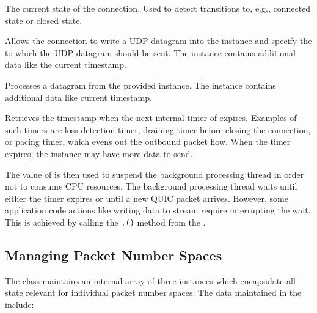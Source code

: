\begin{description}

   The current state of the
connection. Used to detect transitions to, e.g., connected state or closed state.

   Allows the connection to write a UDP datagram into
the \QuicWriter{} instance and specify the  to which the UDP datagram should be
sent. The  instance contains additional data like the current timestamp.

   Processes a datagram from the provided \QuicReader{}
instance. The  instance contains additional data like current
timestamp.

   Retrieves the timestamp when the next
internal timer of expires. Examples of such timers are loss detection timer, draining timer before
closing the connection, or pacing timer, which evens out the outbound packet flow. When the timer
expires, the \ManagedQuicConnection{} instance may have more data to send.

\end{description}

The value of  is then used to suspend the background processing thread
in order not to consume CPU resources. The background processing thread waits until either the timer
expires or until a new QUIC packet arrives. However, some application code actions like writing data
to stream require interrupting the wait. This is achieved by
calling the \texttt{\QuicConnectionContext{}.()} method from the
\ManagedQuicConnection{}.

\subsection{Managing Packet Number Spaces}

The \ManagedQuicConnection{} class maintains an internal array of three \PacketNumberSpace{}
instances which encapsulate all state relevant for individual packet number spaces. The data
maintained in the \PacketNumberSpace{} include:

